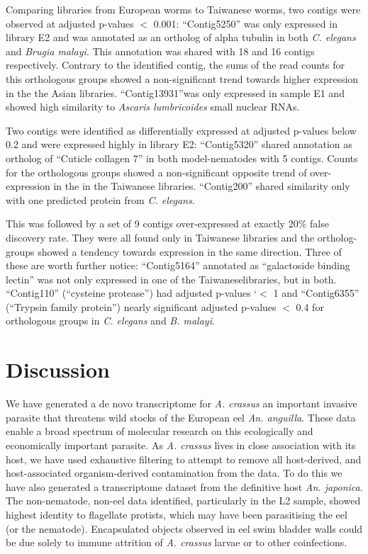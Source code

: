 \documentclass[10pt]{bmc_article}
\newenvironment{bmcformat}{\begin{raggedright}\baselineskip20pt\sloppy\setboolean{publ}{false}}{\end{raggedright}\baselineskip20pt\sloppy}
\begin{document}
\begin{bmcformat}
Comparing libraries from European worms to Taiwanese worms, two
contigs were observed at adjusted p-values $<$ 0.001: ``Contig5250''
was only expressed in library E2 and was annotated as an ortholog of
alpha tubulin in both \textit{C. elegans} and \textit{Brugia
  malayi}. This annotation was shared with
18 and 16
  contigs respectively. Contrary to the identified contig, the sums of
  the read counts for this orthologous groups showed a non-significant
  trend towards higher expression in the the Asian
  libraries. ``Contig13931''was only expressed in sample E1 and showed
  high similarity to \textit{Ascaris lumbricoides} small nuclear RNAs.

  Two contigs were identified as differentially expressed at adjusted
  p-values below 0.2 and were expressed highly in library E2:
  ``Contig5320'' shared annotation as ortholog of ``Cuticle collagen
  7'' in both model-nematodes with
  5 contigs.
    Counts for the orthologous groups showed a non-significant
    opposite trend of over-expression in the in the Taiwanese libraries.
    ``Contig200'' shared similarity only with one predicted protein
    from \textit{C. elegans}.   

    This was followed by a set of
    9 contigs
    over-expressed at exactly 20\% false discovery rate. They were all
    found only in Taiwanese libraries and the ortholog-groups showed a
    tendency towards expression in the same direction. Three of these
    are worth further notice: ``Contig5164'' annotated as
    ``galactoside binding lectin'' was not only expressed in one of
    the Taiwaneselibraries, but in both. ``Contig110'' (``cysteine
    protease'') had adjusted p-values `$<$ 1 and ``Contig6355''
    (``Trypsin family protein'') nearly significant adjusted p-values
    $<$ 0.4 for orthologous groups in \textit{C. elegans} and
    \textit{B. malayi}.


\section*{Discussion}

We have generated a de novo transcriptome for \textit{A. crassus} an
important invasive parasite that threatens wild stocks of the European
eel \textit{An. anguilla}. These data enable a broad spectrum of
molecular research on this ecologically and economically important
parasite. As \textit{A. crassus} lives in close association with its
host, we have used exhaustive filtering to attempt to remove all
host-derived, and host-associated organism-derived contamination from
the data. To do this we have also generated a transcriptome dataset
from the definitive host \textit{An. japonica}. The non-nematode,
non-eel data identified, particularly in the L2 sample, showed highest
identity to flagellate protists, which may have been parasitising the
eel (or the nematode). Encapsulated objects observed in eel swim
bladder walls \cite{heitlinger_massive_2009} could be due solely to
immune attrition of \textit{A. crassus} larvae or to other
coinfections.


\end{bmcformat}
\end{document}
